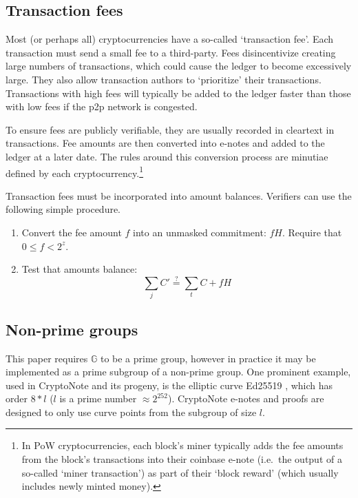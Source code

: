 \subsection{Transaction fees}
\label{subsec:implementers-transaction-fees}

Most (or perhaps all) cryptocurrencies have a so-called `transaction fee'. Each transaction must send a small fee to a third-party. Fees disincentivize creating large numbers of transactions, which could cause the ledger to become excessively large. They also allow transaction authors to `prioritize' their transactions. Transactions with high fees will typically be added to the ledger faster than those with low fees if the p2p network is congested.

To ensure fees are publicly verifiable, they are usually recorded in cleartext in transactions. Fee amounts are then converted into e-notes and added to the ledger at a later date. The rules around this conversion process are minutiae defined by each cryptocurrency.\footnote{In PoW cryptocurrencies, each block's miner typically adds the fee amounts from the block's transactions into their coinbase e-note (i.e.\ the output of a so-called `miner transaction') as part of their `block reward' (which usually includes newly minted money).}

Transaction fees must be incorporated into amount balances. Verifiers can use the following simple procedure.

\begin{enumerate}
    \item Convert the fee amount $f$ into an unmasked commitment: $f H$. Require that $0 \leq f < 2^z$.
    \item Test that amounts balance:
    \[\sum_j C' \stackrel{?}{=} \sum_t C + f H\]
\end{enumerate}


\subsection{Non-prime groups}
\label{subsec:implementers-non-prime-groups}

This paper requires $\mathbb{G}$ to be a prime group, however in practice it may be implemented as a prime subgroup of a non-prime group. One prominent example, used in CryptoNote \cite{cryptoNoteWhitePaper} and its progeny, is the elliptic curve Ed25519 \cite{Bernstein2012-high-speed-high-security-ed25519}, which has order $8*l$ ($l$ is a prime number $\approx 2^{252}$). CryptoNote e-notes and proofs are designed to only use curve points from the subgroup of size $l$.

